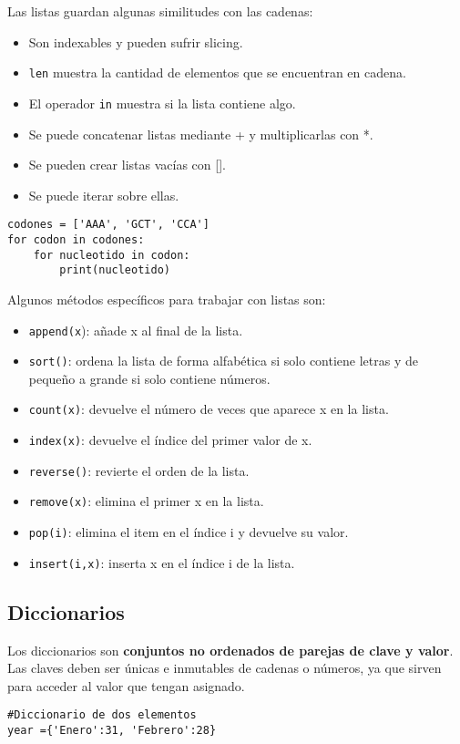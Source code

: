 Las listas guardan algunas similitudes con las cadenas: \begin{itemize}
\item Son indexables y pueden sufrir slicing.
\item \texttt{len} muestra la cantidad de elementos que se encuentran en cadena.
\item El operador \texttt{in} muestra si la lista contiene algo.
\item Se puede concatenar listas mediante + y multiplicarlas con *.
\item Se pueden crear listas vacías con [].
\item Se puede iterar sobre ellas.
\end{itemize}
\begin{lstlisting}
codones = ['AAA', 'GCT', 'CCA']
for codon in codones:
	for nucleotido in codon:
		print(nucleotido)
\end{lstlisting}

Algunos métodos específicos para trabajar con listas son:
\begin{itemize}
\item \texttt{append(x}): añade x al final de la lista.
\item\texttt{sort()}: ordena la lista de forma alfabética si solo contiene letras y de pequeño a grande si solo contiene números. 
\item \texttt{count(x)}: devuelve el número de veces que aparece x en la lista.
\item \texttt{index(x)}: devuelve el índice del primer valor de x.
\item \texttt{reverse()}: revierte el orden de la lista.
\item \texttt{remove(x)}: elimina el primer x en la lista.
\item \texttt{pop(i)}: elimina el item en el índice i y devuelve su valor.
\item \texttt{insert(i,x)}: inserta x en el índice i de la lista.
\end{itemize}

\subsection{Diccionarios}
Los diccionarios son \textbf{conjuntos no ordenados de parejas de clave y valor}. Las claves deben ser únicas e inmutables de cadenas o números, ya que sirven para acceder al valor que tengan asignado. 
\begin{lstlisting}
#Diccionario de dos elementos
year ={'Enero':31, 'Febrero':28}
\end{lstlisting}

